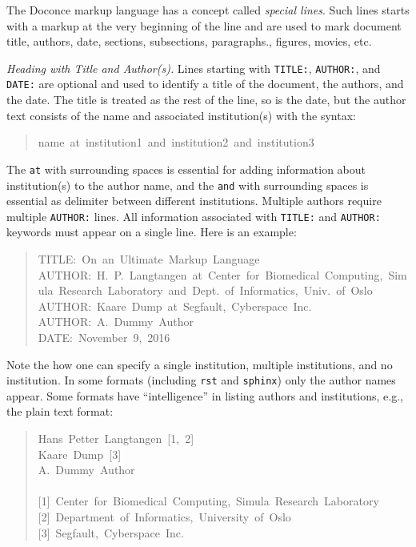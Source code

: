\documentclass[a4paper]{article}
\begin{document}
The Doconce markup language has a concept called \emph{special lines}.
Such lines starts with a markup at the very beginning of the
line and are used to mark document title, authors, date,
sections, subsections, paragraphs., figures, movies, etc.

\emph{Heading with Title and Author(s).} Lines starting with \texttt{TITLE:}, \texttt{AUTHOR:}, and \texttt{DATE:} are optional and used
to identify a title of the document, the authors, and the date. The
title is treated as the rest of the line, so is the date, but the
author text consists of the name and associated institution(s) with
the syntax:
%
\begin{quote}{\ttfamily \raggedright \noindent
name~at~institution1~and~institution2~and~institution3
}
\end{quote}

The \texttt{at} with surrounding spaces
is essential for adding information about institution(s)
to the author name, and the \texttt{and} with surrounding spaces is
essential as delimiter between different institutions.
Multiple authors require multiple \texttt{AUTHOR:} lines. All information
associated with \texttt{TITLE:} and \texttt{AUTHOR:} keywords must appear on a single
line.  Here is an example:
%
\begin{quote}{\ttfamily \raggedright \noindent
TITLE:~On~an~Ultimate~Markup~Language\\
AUTHOR:~H.~P.~Langtangen~at~Center~for~Biomedical~Computing,~Simula~Research~Laboratory~and~Dept.~of~Informatics,~Univ.~of~Oslo\\
AUTHOR:~Kaare~Dump~at~Segfault,~Cyberspace~Inc.\\
AUTHOR:~A.~Dummy~Author\\
DATE:~November~9,~2016
}
\end{quote}

Note the how one can specify a single institution, multiple institutions,
and no institution. In some formats (including \texttt{rst} and \texttt{sphinx})
only the author names appear. Some formats have
``intelligence'' in listing authors and institutions, e.g., the plain text
format:
%
\begin{quote}{\ttfamily \raggedright \noindent
Hans~Petter~Langtangen~{[}1,~2{]}\\
Kaare~Dump~{[}3{]}\\
A.~Dummy~Author\\
~\\
{[}1{]}~Center~for~Biomedical~Computing,~Simula~Research~Laboratory\\
{[}2{]}~Department~of~Informatics,~University~of~Oslo\\
{[}3{]}~Segfault,~Cyberspace~Inc.
}
\end{quote}
\end{document}
